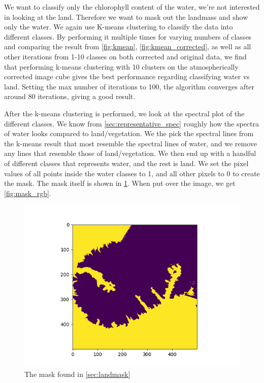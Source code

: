 We want to classify only the chlorophyll content of the water, we're not interested 
in looking at the land. Therefore we want to mask out the landmass and show only 
the water. We again use K-means clustering to classify the data into different 
classes. By performing it multiple times for varying numbers of classes and comparing 
the result from \cref{fig:kmean}, \cref{fig:kmean_corrected}, as well as all other 
iterations from 1-10 classes on both corrected and original data, we find that 
performing k-means clustering with 10 clusters on the atmospherically corrected 
image cube gives the best performance regarding classifying water vs land. Setting 
the max number of iterations to 100, the algorithm converges after around 80 iterations, 
giving a good result. 

After the k-means clustering is performed, we look at the spectral plot of the 
different classes. We know from \cref{sec:representative_spec} roughly how the 
spectra of water looks compared to land/vegetation. We the pick the spectral lines 
from the k-means result that most resemble the spectral lines of water, and we remove 
any lines that resemble those of land/vegetation. We then end up with a handful of 
different classes that represents water, and the rest is land. We set the pixel values 
of all points inside the water classes to 1, and all other pixels to 0 to create the 
mask. The mask itself is shown in \cref{fig:landmask}. When put over the image, we get 
\cref{fig:mask_rgb}.

\begin{figure}
    \centering
    \includegraphics[width=\textwidth]{../fig/landmask.png}
    \caption{The mask found in \cref{sec:landmask}}
    \label{fig:landmask}
\end{figure}

